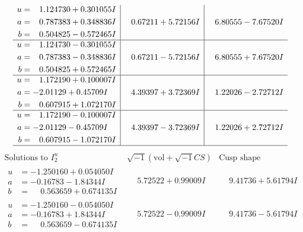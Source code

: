 \documentclass[1p]{elsarticle_modified}
\theoremstyle{definition}
\newcommand{\I}{\sqrt{-1}}
\begin{document}
$$\begin{array}{c|c|c}
\begin{aligned}
u &= \phantom{-}1.124730 + 0.301055 I \\
a &= \phantom{-}0.787383 + 0.348836 I \\
b &= \phantom{-}0.504825 - 0.572465 I\end{aligned}
 & \phantom{-}0.67211 + 5.72156 I & \phantom{-}6.80555 - 7.67520 I \\ \hline\begin{aligned}
u &= \phantom{-}1.124730 - 0.301055 I \\
a &= \phantom{-}0.787383 - 0.348836 I \\
b &= \phantom{-}0.504825 + 0.572465 I\end{aligned}
 & \phantom{-}0.67211 - 5.72156 I & \phantom{-}6.80555 + 7.67520 I \\ \hline\begin{aligned}
u &= \phantom{-}1.172190 + 0.100007 I \\
a &= -2.01129 + 0.45709 I \\
b &= \phantom{-}0.607915 + 1.072170 I\end{aligned}
 & \phantom{-}4.39397 + 3.72369 I & \phantom{-}1.22026 - 2.72712 I \\ \hline\begin{aligned}
u &= \phantom{-}1.172190 - 0.100007 I \\
a &= -2.01129 - 0.45709 I \\
b &= \phantom{-}0.607915 - 1.072170 I\end{aligned}
 & \phantom{-}4.39397 - 3.72369 I & \phantom{-}1.22026 + 2.72712 I\\
 \hline 
 \end{array}$$\newpage$$\begin{array}{c|c|c}  
\text{Solutions to }I^u_{2}& \I (\text{vol} + \sqrt{-1}CS) & \text{Cusp shape}\\
 \hline 
\begin{aligned}
u &= -1.250160 + 0.054050 I \\
a &= -0.16783 - 1.84344 I \\
b &= \phantom{-}0.563659 + 0.674135 I\end{aligned}
 & \phantom{-}5.72522 + 0.99009 I & \phantom{-}9.41736 + 5.61794 I \\ \hline\begin{aligned}
u &= -1.250160 - 0.054050 I \\
a &= -0.16783 + 1.84344 I \\
b &= \phantom{-}0.563659 - 0.674135 I\end{aligned}
 & \phantom{-}5.72522 - 0.99009 I & \phantom{-}9.41736 - 5.61794 I \\ \hline\begin{aligned}

\end{aligned}
\end{array}$$
\end{document}
